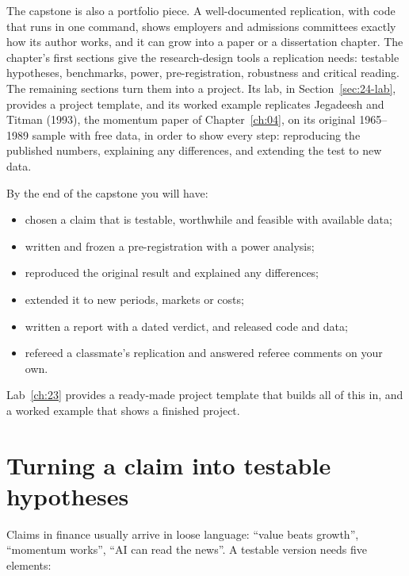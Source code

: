 The capstone is also a portfolio piece. A well-documented replication, with code that runs in one command, shows employers and admissions committees exactly how its author works, and it can grow into a paper or a dissertation chapter. The chapter's first sections give the research-design tools a replication needs: testable hypotheses, benchmarks, power, pre-registration, robustness and critical reading. The remaining sections turn them into a project. Its lab, in Section~\ref{sec:24-lab}, provides a project template, and its worked example replicates Jegadeesh and Titman (1993), the momentum paper of Chapter~\ref{ch:04}, on its original 1965--1989 sample with free data, in order to show every step: reproducing the published numbers, explaining any differences, and extending the test to new data.

By the end of the capstone you will have:

\begin{itemize}
  \item chosen a claim that is testable, worthwhile and feasible with available data;
  \item written and frozen a pre-registration with a power analysis;
  \item reproduced the original result and explained any differences;
  \item extended it to new periods, markets or costs;
  \item written a report with a dated verdict, and released code and data;
  \item refereed a classmate's replication and answered referee comments on your own.
\end{itemize}

Lab~\ref{ch:23} provides a ready-made project template that builds all of this in, and a worked example that shows a finished project.


\section{Turning a claim into testable hypotheses}
\label{sec:24-hypotheses}

Claims in finance usually arrive in loose language: ``value beats growth'', ``momentum works'', ``AI can read the news''. A testable version needs five elements:

